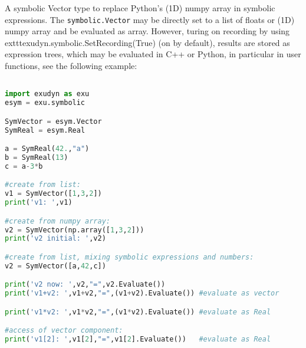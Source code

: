 A symbolic Vector type to replace Python's (1D) numpy array in symbolic expressions. The \texttt{symbolic.Vector} may be directly set to a list of floats or (1D) numpy array and be evaluated as array. However, turing on recording by using 	exttt{exudyn.symbolic.SetRecording(True)} (on by default), results are stored as expression trees, which may be evaluated in C++ or Python, in particular in user functions, see the following example:
\pythonstyle
\begin{lstlisting}[language=Python, firstnumber=1]

import exudyn as exu
esym = exu.symbolic

SymVector = esym.Vector
SymReal = esym.Real 

a = SymReal(42.,"a")
b = SymReal(13)
c = a-3*b

#create from list:
v1 = SymVector([1,3,2])
print('v1: ',v1)

#create from numpy array:
v2 = SymVector(np.array([1,3,2]))
print('v2 initial: ',v2)

#create from list, mixing symbolic expressions and numbers:
v2 = SymVector([a,42,c])

print('v2 now: ',v2,"=",v2.Evaluate())
print('v1+v2: ',v1+v2,"=",(v1+v2).Evaluate()) #evaluate as vector

print('v1*v2: ',v1*v2,"=",(v1*v2).Evaluate()) #evaluate as Real

#access of vector component:
print('v1[2]: ',v1[2],"=",v1[2].Evaluate())   #evaluate as Real
\end{lstlisting}


